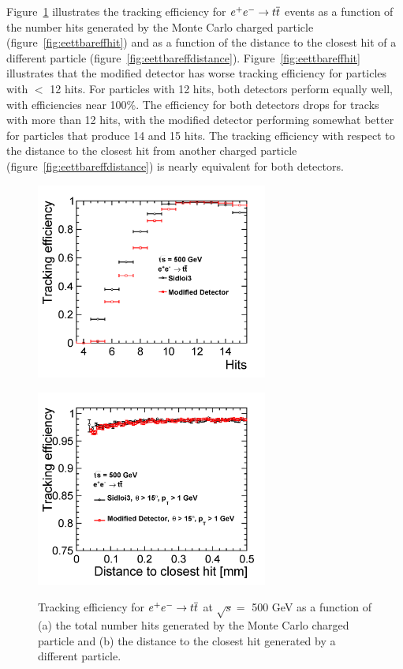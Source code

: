 Figure~\ref{fig:eettbareffhitdist} illustrates the tracking efficiency for $\ee \rightarrow \ttbar$ events as a function of the number hits
generated by the Monte Carlo charged particle (figure~\ref{fig:eettbareffhit})
and as a function of the distance to the closest hit of a different particle (figure~\ref{fig:eettbareffdistance}).
Figure~\ref{fig:eettbareffhit} illustrates that the modified detector has worse tracking efficiency
for particles with $<$ 12 hits.
For particles with 12 hits, both detectors perform equally well, with efficiencies near 100\%.
The efficiency for both detectors drops for tracks with more than 12 hits, 
with the modified detector performing somewhat better for particles that produce 14 and 15 hits.
The tracking efficiency with respect to the distance to the closest hit
from another charged particle (figure~\ref{fig:eettbareffdistance}) is nearly equivalent for both detectors.
\begin{figure}[h!]
\begin{minipage}{.5\textwidth}
\centering
\includegraphics[width=3.0in]{eettbarEfficiencyHits_sidloi3_det_vtxbar_3doublet.png}
\label{fig:eettbareffhit}
\end{minipage}
\begin{minipage}{.5\textwidth}
\centering
\includegraphics[width=3.0in]{eettbarEfficiencyDistance_sidloi3_det_vtxbar_3doublet.png}
\label{fig:eettbareffdistance}
\end{minipage}
\caption{Tracking efficiency for $\ee \rightarrow \ttbar$ at $ \sqrt{s} = $ 500 GeV as a function of (a) the total number
hits generated by the Monte Carlo charged particle and (b) the distance to the closest hit generated by a different particle.}
\label{fig:eettbareffhitdist}
\end{figure}

